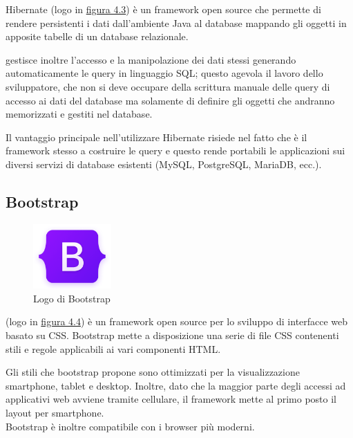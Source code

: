 \noindent Hibernate (logo in {\hyperref[fig:hibernate]{figura 4.3}}) è un framework open source che permette di  rendere persistenti i dati dall'ambiente Java al database mappando gli oggetti in apposite tabelle di un database relazionale.

\setlength{\parskip}{3ex}

\ap{{[b]}} gestisce inoltre l'accesso e la manipolazione dei dati stessi generando automaticamente le query in linguaggio SQL; questo agevola il lavoro dello sviluppatore, che non si deve occupare della scrittura manuale delle query di accesso ai dati del database ma solamente di definire gli oggetti che andranno memorizzati e gestiti nel database.

\setlength{\parskip}{2ex}

\noindent Il vantaggio principale nell'utilizzare Hibernate risiede nel fatto che è il framework stesso a costruire le query e questo rende portabili le applicazioni sui diversi servizi di database esistenti (MySQL, PostgreSQL, MariaDB, ecc.).

\subsection{Bootstrap}

\begin{figure}[!h]
	\centering
	\includegraphics[width=3cm]{../images/Bootstrap-logo.png}
	\caption{Logo di Bootstrap}
	\label{fig:bootstrap}
\end{figure}

\ap{{[b]}} (logo in {\hyperref[fig:bootstrap]{figura 4.4}}) è un framework open source per lo sviluppo di interfacce web basato su CSS. Bootstrap mette a disposizione una serie di file CSS contenenti stili e regole applicabili ai vari componenti HTML.

\setlength{\parskip}{3ex}

\noindent Gli stili che bootstrap propone sono ottimizzati per la visualizzazione smartphone, tablet e desktop. Inoltre, dato che la maggior parte degli accessi ad applicativi web avviene tramite cellulare, il framework mette al primo posto il layout per smartphone.\\
Bootstrap è inoltre compatibile con i browser più moderni.

